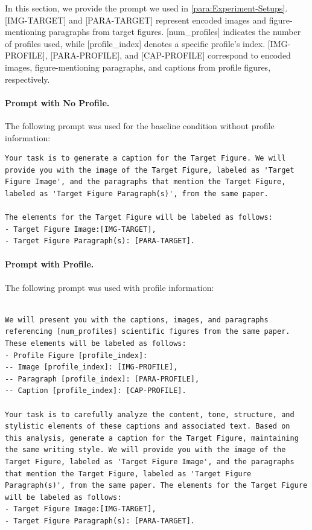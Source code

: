 In this section, we provide the prompt we used in \autoref{para:Experiment-Setups}. [IMG-TARGET] and [PARA-TARGET] represent encoded images and figure-mentioning paragraphs from target figures. [num\_profiles] indicates the number of profiles used, while [profile\_index] denotes a specific profile's index. [IMG-PROFILE], [PARA-PROFILE], and [CAP-PROFILE] correspond to encoded images, figure-mentioning paragraphs, and captions from profile figures, respectively.

\paragraph{Prompt with No Profile.}
The following prompt was used for the baseline condition without profile information:
\begin{lstlisting}[basicstyle=\small\ttfamily, breaklines=true, frame=single]
Your task is to generate a caption for the Target Figure. We will provide you with the image of the Target Figure, labeled as 'Target Figure Image', and the paragraphs that mention the Target Figure, labeled as 'Target Figure Paragraph(s)', from the same paper. 

The elements for the Target Figure will be labeled as follows:
- Target Figure Image:[IMG-TARGET], 
- Target Figure Paragraph(s): [PARA-TARGET].
\end{lstlisting}


\paragraph{Prompt with Profile.}
The following prompt was used with profile information:
\begin{lstlisting}[basicstyle=\small\ttfamily, breaklines=true, frame=single]

We will present you with the captions, images, and paragraphs referencing [num_profiles] scientific figures from the same paper. These elements will be labeled as follows: 
- Profile Figure [profile_index]:
-- Image [profile_index]: [IMG-PROFILE], 
-- Paragraph [profile_index]: [PARA-PROFILE], 
-- Caption [profile_index]: [CAP-PROFILE].

Your task is to carefully analyze the content, tone, structure, and stylistic elements of these captions and associated text. Based on this analysis, generate a caption for the Target Figure, maintaining the same writing style. We will provide you with the image of the Target Figure, labeled as 'Target Figure Image', and the paragraphs that mention the Target Figure, labeled as 'Target Figure Paragraph(s)', from the same paper. The elements for the Target Figure will be labeled as follows:
- Target Figure Image:[IMG-TARGET],
- Target Figure Paragraph(s): [PARA-TARGET].
\end{lstlisting}